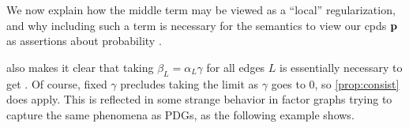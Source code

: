 \documentclass{article}
\begin{document}
	\begin{inactive}
	We now explain how the middle term may be viewed as a ``local'' regularization,
	and why including such a term is necessary for the semantics to 
	view our cpds $\mathbf p$ as assertions about probability%
	. 
\end{inactive}
	
	 also makes it clear that 
	taking $\beta_L = {\alpha_L} \gamma$ for all edges $L$ is
	essentially necessary to get .
	Of course, fixed $\gamma$ precludes taking the limit as $\gamma$ goes
	to 0, so 
	\cref{prop:consist} does apply. This is reflected in 
	some strange
	behavior in factor graphs trying to capture the same phenomena as
	PDGs, as the following example shows.
	
\end{document}
